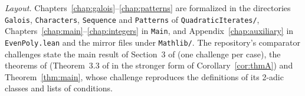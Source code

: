 \emph{Layout.} Chapters~\ref{chap:galois}--\ref{chap:patterns} are formalized in the
directories \texttt{Galois}, \texttt{Characters}, \texttt{Sequence} and \texttt{Patterns} of
\texttt{QuadraticIterates/}, Chapters~\ref{chap:main}--\ref{chap:integers} in \texttt{Main}, and
Appendix~\ref{chap:auxiliary} in \texttt{EvenPoly.lean} and the mirror files under
\texttt{Mathlib/}. The repository's comparator challenges state the main result of Section~3 of
\cite{paper} (one challenge per case), the theorems of \cite{li2020, li2021} (Theorem~3.3 of
\cite{li2021} in the stronger form of Corollary~\ref{cor:thmA}) and Theorem~\ref{thm:main},
whose challenge reproduces the definitions of its 2-adic classes and lists of conditions.
